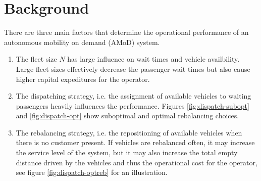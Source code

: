 \section{Background}
\label{sec:background}

There are three main factors that determine the operational performance of an autonomous mobility on demand (AMoD) system.

\begin{enumerate}
\item The fleet size $N$ has large influence on wait times and vehicle availbility. Large fleet sizes effectively decrease the passenger wait times but also cause higher capital expeditures for the operator.
\item The dispatching strategy, i.e. the assignment of available vehicles to waiting passengers heavily influences the performance. Figures \ref{fig:dispatch-subopt} and \ref{fig:dispatch-opt} show suboptimal and optimal rebalancing choices.
\item The rebalancing strategy, i.e. the repositioning of available vehicles when there is no customer present. If vehicles are rebalanced often, it may increase the service level of the system, but it may also increase the total empty distance driven by the vehicles and thus the operational cost for the operator, see figure \ref{fig:dispatch-optreb} for an illustration.
\end{enumerate}



